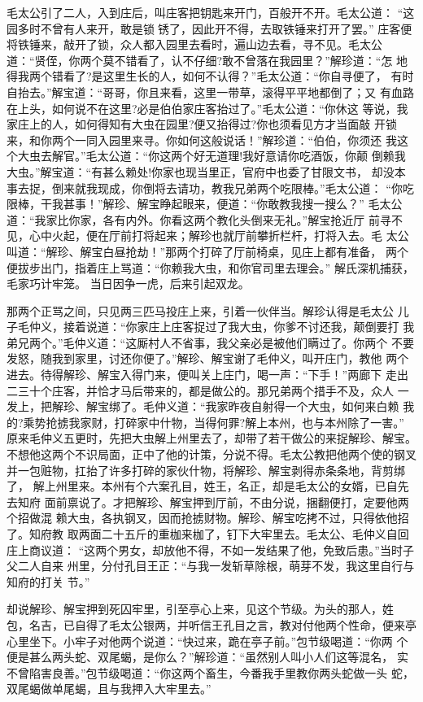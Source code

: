毛太公引了二人，入到庄后，叫庄客把钥匙来开门，百般开不开。毛太公道：
“这园多时不曾有人来开，敢是锁锈了，因此开不得，去取铁锤来打开了罢。”
庄客便将铁锤来，敲开了锁，众人都入园里去看时，遍山边去看，寻不见。毛太公
道：“贤侄，你两个莫不错看了，认不仔细?敢不曾落在我园里？”解珍道：“怎
地得我两个错看了?是这里生长的人，如何不认得？”毛太公道：“你自寻便了，
有时自抬去。”解宝道：“哥哥，你且来看，这里一带草，滚得平平地都倒了；又
有血路在上头，如何说不在这里?必是伯伯家庄客抬过了。”毛太公道：“你休这
等说，我家庄上的人，如何得知有大虫在园里?便又抬得过?你也须看见方才当面敲
开锁来，和你两个一同入园里来寻。你如何这般说话！”解珍道：“伯伯，你须还
我这个大虫去解官。”毛太公道：“你这两个好无道理!我好意请你吃酒饭，你颠
倒赖我大虫。”解宝道：“有甚么赖处!你家也现当里正，官府中也委了甘限文书，
却没本事去捉，倒来就我现成，你倒将去请功，教我兄弟两个吃限棒。”毛太公道：
“你吃限棒，干我甚事！”解珍、解宝睁起眼来，便道：“你敢教我搜一搜么？”
毛太公道：“我家比你家，各有内外。你看这两个教化头倒来无礼。”解宝抢近厅
前寻不见，心中火起，便在厅前打将起来；解珍也就厅前攀折栏杆，打将入去。毛
太公叫道：“解珍、解宝白昼抢劫！”那两个打碎了厅前椅桌，见庄上都有准备，
两个便拔步出门，指着庄上骂道：“你赖我大虫，和你官司里去理会。”
解氏深机捕获，毛家巧计牢笼。
当日因争一虎，后来引起双龙。

那两个正骂之间，只见两三匹马投庄上来，引着一伙伴当。解珍认得是毛太公
儿子毛仲义，接着说道：“你家庄上庄客捉过了我大虫，你爹不讨还我，颠倒要打
我弟兄两个。”毛仲义道：“这厮村人不省事，我父亲必是被他们瞒过了。你两个
不要发怒，随我到家里，讨还你便了。”解珍、解宝谢了毛仲义，叫开庄门，教他
两个进去。待得解珍、解宝入得门来，便叫关上庄门，喝一声：“下手！”两廊下
走出二三十个庄客，并恰才马后带来的，都是做公的。那兄弟两个措手不及，众人
一发上，把解珍、解宝绑了。毛仲义道：“我家昨夜自射得一个大虫，如何来白赖
我的?乘势抢掳我家财，打碎家中什物，当得何罪?解上本州，也与本州除了一害。”
原来毛仲义五更时，先把大虫解上州里去了，却带了若干做公的来捉解珍、解宝。
不想他这两个不识局面，正中了他的计策，分说不得。毛太公教把他两个使的钢叉
并一包赃物，扛抬了许多打碎的家伙什物，将解珍、解宝剥得赤条条地，背剪绑了，
解上州里来。本州有个六案孔目，姓王，名正，却是毛太公的女婿，已自先去知府
面前禀说了。才把解珍、解宝押到厅前，不由分说，捆翻便打，定要他两个招做混
赖大虫，各执钢叉，因而抢掳财物。解珍、解宝吃拷不过，只得依他招了。知府教
取两面二十五斤的重枷来枷了，钉下大牢里去。毛太公、毛仲义自回庄上商议道：
“这两个男女，却放他不得，不如一发结果了他，免致后患。”当时子父二人自来
州里，分付孔目王正：“与我一发斩草除根，萌芽不发，我这里自行与知府的打关
节。”

却说解珍、解宝押到死囚牢里，引至亭心上来，见这个节级。为头的那人，姓
包，名吉，已自得了毛太公银两，并听信王孔目之言，教对付他两个性命，便来亭
心里坐下。小牢子对他两个说道：“快过来，跪在亭子前。”包节级喝道：“你两
个便是甚么两头蛇、双尾蝎，是你么？”解珍道：“虽然别人叫小人们这等混名，
实不曾陷害良善。”包节级喝道：“你这两个畜生，今番我手里教你两头蛇做一头
蛇，双尾蝎做单尾蝎，且与我押入大牢里去。”

